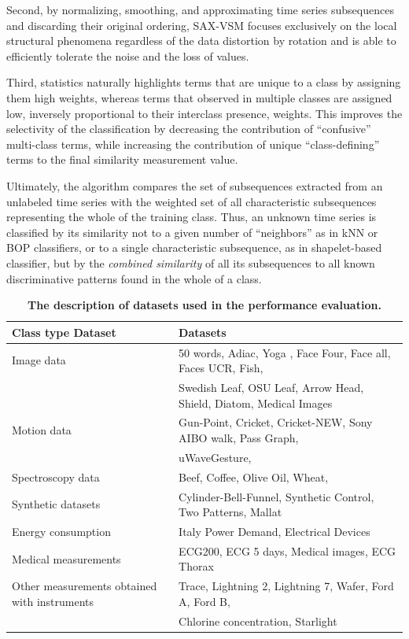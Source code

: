 Second, by normalizing, smoothing, and approximating time series subsequences and discarding their 
original ordering, SAX-VSM focuses exclusively on the local structural phenomena regardless of the 
data distortion by rotation and is able to efficiently tolerate the noise and the loss of values.

Third,  \tfidf statistics naturally highlights terms that are unique to a class by assigning them high weights, 
whereas terms that observed in multiple classes are assigned low, 
inversely proportional to their interclass presence, weights. 
This improves the selectivity of the classification by decreasing the contribution of ``confusive'' multi-class terms, 
while increasing the contribution of unique ``class-defining'' terms to the final similarity measurement value.

Ultimately, the algorithm compares the set of subsequences extracted from an unlabeled time series 
with the weighted set of all characteristic subsequences representing the whole of the training class. 
Thus, an unknown time series is classified by its similarity not to a given number of 
``neighbors'' as in kNN or BOP classifiers, or to a single characteristic subsequence, as in shapelet-based classifier, 
but by the \textit{combined similarity} of all its subsequences to all known discriminative patterns found in the 
whole of a class.

\begin{table}[t]
\caption{\bf The description of datasets used in the performance evaluation.}
\vspace{0.4cm}
 \label{data_typetable1}
\centering
{\setlength{\extrarowheight}{2pt}%
{\footnotesize
\begin{tabularx}{\linewidth}{@{} l l @{}}
\hline
Class type Dataset & Datasets \\[0.5ex]
\hline
Image data & 50 words, Adiac, Yoga , Face Four, Face all, Faces UCR, Fish, \\
 & Swedish Leaf, OSU Leaf, Arrow Head, Shield, Diatom, Medical Images \\[0.5ex]
Motion data & Gun-Point, Cricket, Cricket-NEW, Sony AIBO walk, Pass Graph, \\ 
 & uWaveGesture, \\[0.5ex]
Spectroscopy data & Beef, Coffee, Olive Oil, Wheat, \\[0.5ex]
Synthetic datasets & Cylinder-Bell-Funnel, Synthetic Control, Two Patterns, Mallat \\[0.5ex]
Energy consumption & Italy Power Demand, Electrical Devices \\[0.5ex]
Medical measurements & ECG200, ECG 5 days, Medical images, ECG Thorax \\[0.5ex]
Other measurements obtained with instruments & Trace, Lightning 2, Lightning 7, Wafer, Ford A, Ford B, \\
 & Chlorine concentration, Starlight \\[0.5ex]
\hline
\end{tabularx}
}}
\end{table}

